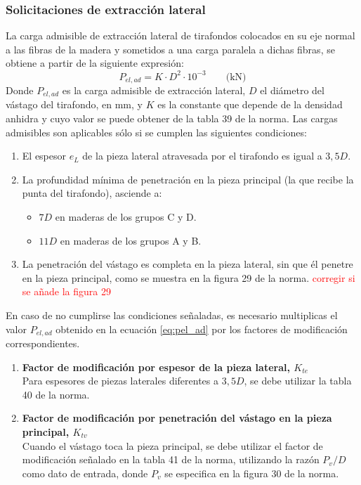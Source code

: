 \subsubsection{Solicitaciones de extracción lateral}
La carga admisible de extracción lateral de tirafondos colocados en su eje normal a las fibras de la madera y sometidos a una carga paralela a dichas fibras, se obtiene a partir de la siguiente expresión:
\begin{equation}\label{eq:pel_ad}
	P_{el,ad}=K\cdot D^2 \cdot 10^{-3} \qquad \text{(kN)}
\end{equation}
Donde $P_{el,ad}$ es la carga admisible de extracción lateral, $D$ el diámetro del vástago del tirafondo, en mm, y $K$ es la constante que depende de la densidad anhidra y cuyo valor se puede obtener de la tabla 39 de la norma.
Las cargas admisibles son aplicables sólo si se cumplen las siguientes condiciones:
\begin{enumerate}
	\item El espesor $e_L$ de la pieza lateral atravesada por el tirafondo es igual a $3,5D$.
	\item La profundidad mínima de penetración en la pieza principal (la que recibe la punta del tirafondo), asciende a:
	\begin{itemize}
		\item $7D$ en maderas de los grupos C y D.
		\item $11D$ en maderas de los grupos A y B.
	\end{itemize}
	\item La penetración del vástago es completa en la pieza lateral, sin que él penetre en la pieza principal, como se muestra en la figura 29 de la norma. \textcolor{red}{corregir si se añade la figura 29}
\end{enumerate}

En caso de no cumplirse las condiciones señaladas, es necesario multiplicas el valor $P_{el,ad}$ obtenido en la ecuación \ref{eq:pel_ad} por los factores de modificación correspondientes.
\begin{enumerate}
	\item \textbf{Factor de modificación por espesor de la pieza lateral, $K_{te}$}\\
	Para espesores de piezas laterales diferentes a $3,5D$, se debe utilizar la tabla 40 de la norma.
	\item \textbf{Factor de modificación por penetración del vástago en la pieza principal, $K_{tv}$}\\
	Cuando el vástago toca la pieza principal, se debe utilizar el factor de modificación señalado en la tabla 41 de la norma, utilizando la razón $P_v / D$ como dato de entrada, donde $P_v$ se especifica en la figura 30 de la norma.	
\end{enumerate}

